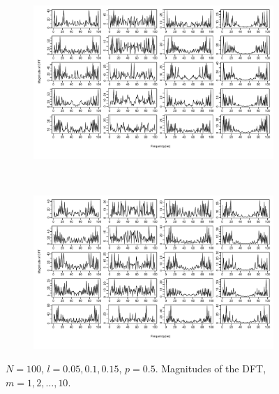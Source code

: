 \documentclass[11pt, a4paper]{article} %
\begin{document}
\begin{figure}
\begin{subfigure}{1.1\textwidth}
  \centering
  \includegraphics[width=\linewidth]{N100_MagnDFT_p05_m_1_5.pdf}
  \label{fig:sfig1}
\end{subfigure}\\
\begin{subfigure}{1.1\textwidth}
  \centering
  \includegraphics[width=\linewidth]{N100_MagnDFT_p05_m_6_10.pdf}
  \label{fig:sfig2}
\end{subfigure}
\label{fig1}
\caption{$N = 100$, $l = 0.05, 0.1, 0.15$, $p = 0.5$. Magnitudes of the DFT, $m = 1,2, \dots, 10$.}
\end{figure}

\restoregeometry


\end{document}
